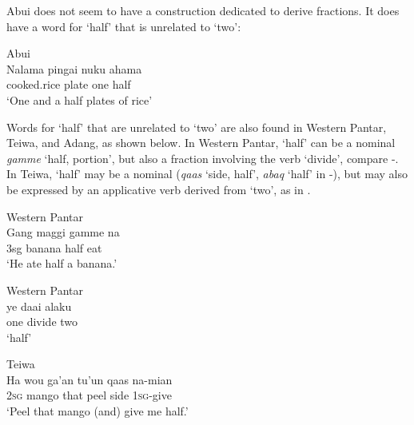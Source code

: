      

 

Abui does not seem to have a construction dedicated to derive fractions. It does have a word for `half' that is unrelated to `two':  


\ea
\label{ex:8:1249}
{\upshape Abui}\\
 \gll   Nalama  pingai  nuku  ahama   \\
    cooked.rice  plate  one  half   \\
 \glt  `One and a half plates of rice'  
\z

 
Words for `half' that are unrelated to `two' are also found in Western Pantar,  Teiwa, and Adang, as shown below.  In Western Pantar, `half' can be a nominal \textit{gamme} `half, portion', but also a fraction involving the verb `divide', compare -. In Teiwa, `half' may be a nominal (\textit{qaas} `side, half', \textit{abaq} `half' in -), but may also be expressed by an applicative verb derived from `two', as in .


\ea%
\label{bkm:Ref342746707}
{\upshape Western Pantar}\\
\gll   Gang  maggi  gamme  na  \\  
      3sg  banana  half  eat  \\
\glt  `He ate half a banana.'
\z








\ea%
\label{bkm:Ref342746708}
{\upshape Western Pantar}\\
\gll  ye  daai  alaku   \\  
    one  divide  two    \\
\glt  `half' 
\z








\ea%
\label{bkm:Ref342746924}
{\upshape Teiwa}\\
\gll  Ha  wou  ga'an  tu'un  qaas  na-mian \\  
     \textsc{2sg} mango  that  peel  side  \textsc{1sg}{}-give \\
\glt  `Peel that mango (and) give me half.'
\z









